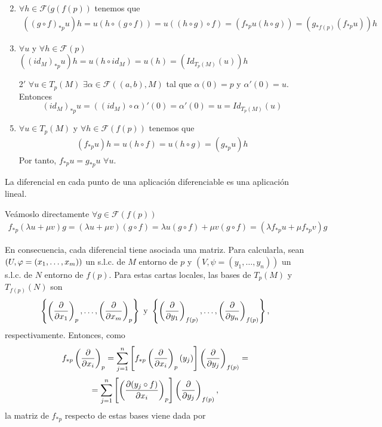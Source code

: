 \documentclass[Cursovd_portada.tex]{subfiles}
\begin{document}
\begin{dem}
\begin{enumerate}
\item[]
\item $\forall h \in \mathcal{F}(g(f(p))$ tenemos que 
\begin{gather*}
((g\circ f)_{\ast p}u)h = u(h\circ(g \circ f)) = u ((h\circ g) \circ f) = (f_{\ast p}u(h \circ g)) = (g_{\ast f(p)}(f_{\ast p} u))h
\end{gather*}
\item $\forall u$ y $\forall h \in \mathcal{F}(p)$ $((id_M)_{\ast p}u)h = u(h \circ id_M) = u(h)=(Id_{T_p(M)}(u))h$
\item[2$'$] $\forall u \in T_p(M)$ $\exists \alpha\in \mathcal{F}((a,b),M)$ tal que $\alpha(0)=p$ y $\alpha'(0)=u$. Entonces
$$
(id_M)_{\ast p}u = ((id_M)\circ \alpha)'(0) = \alpha'(0) = u = Id_{T_p(M)}(u)
$$
\item $\forall u \in T_p(M)$ y $\forall h\in \mathcal{F}(f(p))$ tenemos que 
\begin{gather*}
(f_{\ast p}u)h = u(h\circ f)=u(h \circ g) = (g_{\ast p} u)h
\end{gather*}
Por tanto, $f_{\ast p}u=g_{\ast p}u$ $\forall u$.
\end{enumerate}
\end{dem}
\begin{prop}
La diferencial en cada punto de una aplicación diferenciable es una aplicación lineal.
\end{prop}
\begin{dem}
Veámoslo directamente $\forall g\in \mathcal{F}(f(p))$
\begin{gather*}
 f_{\ast p}(\lambda u+\mu v)g = (\lambda u+\mu v)(g\circ f)= \lambda u(g \circ f)+\mu v(g \circ f) = (\lambda f_{\ast p} u + \mu f_{\ast p}v)g
\end{gather*}
\end{dem}
En consecuencia, cada diferencial tiene asociada una matriz. Para calcularla, sean $(U,\varphi=(x_1,\dots ,x_m))$ un
s.l.c. de $M$ entorno de $p$ y $(V,\psi=(y_1,\dots ,y_n))$ un s.l.c. de $N$ entorno de $f(p)$. Para estas cartas
locales, las bases de $T_p(M)$ y $T_{f(p)}(N)$ son
$$\left\{\left(\displaystyle{\frac{\partial}{\partial x_1}}\right)_p,\dots ,\left(\displaystyle{\frac{\partial}{\partial x_m}}\right)_p\right\}\mbox{ }{\rm y}\mbox{
}\left\{\left(\displaystyle{\frac{\partial}{\partial y_1}}\right)_{f(p)},\dots ,\left(\displaystyle{\frac{\partial}{\partial y_n}}\right)_{f(p)}\right\},$$ respectivamente. Entonces,
como
$$f_{*p}\left(\displaystyle{\frac{\partial}{\partial x_i}}\right)_p=\sum_{j=1}^n\left[f_{*p}\left(\displaystyle{\frac{\partial}{\partial x_i}}\right)_p(y_j)\right]\left(\displaystyle{\frac{\partial}{\partial y_j}}
\right)_{f(p)}=$$ $$=\sum_{j=1}^n\left[\left(\displaystyle{\frac{\partial (y_j\circ f)}{\partial x_i}}\right)_p\right]\left(\displaystyle{\frac{\partial}{\partial y_j}}
\right)_{f(p)},$$ la matriz de $f_{*p}$ respecto de estas bases viene dada por
\end{document}
